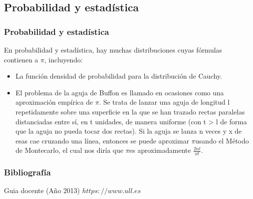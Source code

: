 \documentclass{beamer}
\newcommand{\PI}{{$\pi$}}
\begin{document}
\subsection{Probabilidad y estadística}
\begin{frame}
\frametitle{Probabilidad y estadística}
En probabilidad y estadística, hay muchas distribuciones cuyas fórmulas contienen a \PI, incluyendo:
\begin{itemize}
\item La función densidad de probabilidad para la distribución de Cauchy.

\item El problema de la aguja de Buffon es llamado en ocasiones como una aproximación empírica de \PI. Se trata de lanzar una aguja de longitud l repetidamente sobre una superficie en la que se han trazado rectas paralelas distanciadas entre sí, en t unidades, de manera uniforme (con t > l de forma que la aguja no pueda tocar dos rectas). Si la aguja se lanza n veces y x de esas cae cruzando una línea, entonces se puede aproximar \PI usando el Método de Montecarlo, el cual nos diría que \PI es aproximadamente $\frac{2nl}{xt}$.\cite{link2}
\end{itemize}

\end{frame}

\begin{frame}
\frametitle{Bibliografía}
\begin{thebibliography}
\beamertemplatebookbibitems
{}
Guia docente (Año 2013)
{\small $https://www.ull.es$}

\end{thebibliography}
\end{frame}
\end{document}
